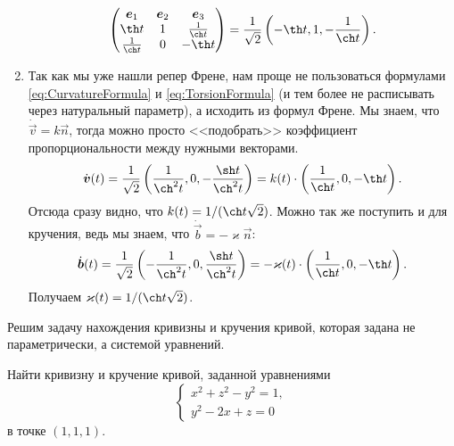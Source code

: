 \begin{solution}
\begin{enumerate}[nolistsep, label=(\arabic*)]
\[				\begin{pmatrix}
					\vec{e}_1 & \vec{e}_2 & \vec{e}_3\\
					\th t & 1 & \frac{1}{\ch t}\\
					\frac{1}{\ch t} & 0 & -\th t
				\end{pmatrix} = \frac{1}{\sqrt{2}}\br{-\th t, 1, -\frac{1}{\ch t}}.
			\]
		\item Так как мы уже нашли репер Френе, нам проще не пользоваться формулами \eqref{eq:CurvatureFormula} и \eqref{eq:TorsionFormula} (и тем более не расписывать через натуральный параметр), а исходить из формул Френе. Мы знаем, что $\dot{\vec{v}} = k\vec{n}$, тогда можно просто <<подобрать>> коэффициент пропорциональности между нужными векторами.
			\[
				\dot{\vec{v}}(t) = \frac{1}{\sqrt{2}}\br{\frac{1}{\ch^2t}, 0, -\frac{\sh t}{\ch^2t}} = k(t) \cdot \br{\frac{1}{\ch t}, 0, -\th t}.
			\]
			Отсюда сразу видно, что $k(t) = 1 / (\ch t\sqrt{2})$. Можно так же поступить и для кручения, ведь мы знаем, что $\dot{\vec{b}} = -\varkappa\vec{n}$:
			\[
				\dot{\vec{b}}(t) = \frac{1}{\sqrt{2}}\br{-\frac{1}{\ch^2t}, 0, \frac{\sh t}{\ch^2t}} = -\varkappa(t) \cdot \br{\frac{1}{\ch t}, 0, -\th t}.
			\]
			Получаем $\varkappa(t) = 1 / (\ch t\sqrt{2})$.
	\end{enumerate}
\end{solution}

Решим задачу нахождения кривизны и кручения кривой, которая задана не параметрически, а системой уравнений.

\begin{problem}
	Найти кривизну и кручение кривой, заданной уравнениями
	\[
		\begin{cases}
			x^2 + z^2 - y^2 = 1,\\
			y^2 - 2x + z = 0
		\end{cases}
	\]
	в точке $(1, 1, 1)$.
\end{problem}


